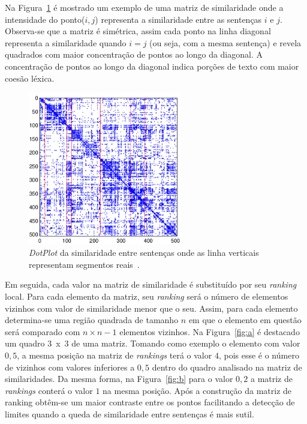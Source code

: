 
Na Figura~\ref{fig:matrix-similarity} é mostrado um exemplo de uma matriz de similaridade onde a intensidade do ponto($i,j$) representa a similaridade entre as sentenças $i$ e $j$. Observa-se que a matriz é simétrica, assim cada ponto na linha diagonal representa a similaridade quando $i = j$ (ou seja, com a mesma sentença) e revela quadrados com maior concentração de pontos ao longo da diagonal. A concentração de pontos ao longo da diagonal indica porções de texto com maior coesão léxica.


  \begin{figure}[!h]
	  \centering
	  \includegraphics[width=0.6\textwidth]{conteudo/capitulos/figs/c99-ranking-matrix.png}
	  \caption{\textit{DotPlot} da similaridade entre sentenças onde as linha verticais representam segmentos reais~\cite{Eisenstein2008}.}
	  \label{fig:matrix-similarity}
  \end{figure}




Em seguida, cada valor na matriz de similaridade é substituído por seu \textit{ranking} local. Para cada elemento da matriz, seu \textit{ranking} será o número de elementos vizinhos com valor de similaridade menor que o seu. Assim, para cada elemento determina-se uma região quadrada de tamanho $n$ em que o elemento em questão será comparado com $n \times n - 1$ elementos vizinhos.
% 
% 
Na Figura~\ref{fig:a} é destacado um quadro 3~x~3 de uma matriz. Tomando como exemplo o elemento com valor $0,5$, a mesma posição na matriz de \textit{rankings} terá o valor $4$, pois esse é o número de vizinhos com valores inferiores a $0,5$ dentro do quadro analisado na matriz de similaridades. Da mesma forma, na Figura~\ref{fig:b} para o valor $0,2$ a matriz de \textit{rankings} conterá o valor $1$ na mesma posição. Após a construção da matriz de ranking obtêm-se um maior contraste entre os pontos facilitando a detecção de limites quando a queda de similaridade entre sentenças é mais sutil.

